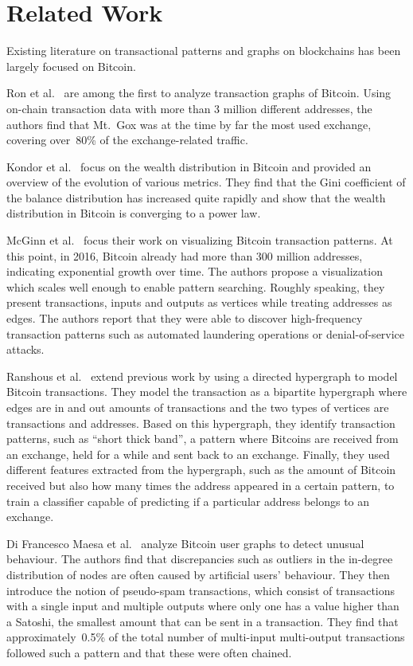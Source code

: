 \section{Related Work}
\label{sec:4:related}

Existing literature on transactional patterns and graphs on blockchains has been largely focused on Bitcoin.

Ron et al.~\cite{10.1007/978-3-642-39884-1_2} are among the first to analyze transaction graphs of Bitcoin. Using on-chain transaction data with more than 3 million different addresses, the authors find that Mt.~Gox was at the time by far the most used exchange, covering over~80\% of the exchange-related traffic.

Kondor et al.~\cite{10.1371/journal.pone.0086197} focus on the wealth distribution in Bitcoin and provided an overview of the evolution of various metrics. They find that the Gini coefficient of the balance distribution has increased quite rapidly and show that the wealth distribution in Bitcoin is converging to a power law.

McGinn et al.~\cite{mcginn2016visualizing} focus their work on visualizing Bitcoin transaction patterns. At this point, in 2016, Bitcoin already had more than 300 million addresses, indicating exponential growth over time. The authors propose a visualization which scales well enough to enable pattern searching. Roughly speaking, they present transactions, inputs and outputs as vertices while treating addresses as edges. The authors report that they were able to discover high-frequency transaction patterns such as automated laundering operations or denial-of-service attacks.

Ranshous et al.~\cite{10.1007/978-3-319-70278-0_16} extend previous work by using a directed hypergraph to model Bitcoin transactions. They model the transaction as a bipartite hypergraph where edges are in and out amounts of transactions and the two types of vertices are transactions and addresses. Based on this hypergraph, they identify transaction patterns, such as ``short thick band'', a pattern where Bitcoins are received from an exchange, held for a while and sent back to an exchange. Finally, they used different features extracted from the hypergraph, such as the amount of Bitcoin received but also how many times the address appeared in a certain pattern, to train a classifier capable of predicting if a particular address belongs to an exchange.

Di Francesco Maesa et al.~\cite{10.1007/978-3-319-50901-3_59} analyze Bitcoin user graphs to detect unusual behaviour. The authors find that discrepancies such as outliers in the in-degree distribution of nodes are often caused by artificial users' behaviour. They then introduce the notion of pseudo-spam transactions, which consist of transactions with a single input and multiple outputs where only one has a value higher than a Satoshi, the smallest amount that can be sent in a transaction. They find that approximately~0.5\% of the total number of multi-input multi-output transactions followed such a pattern and that these were often chained.

